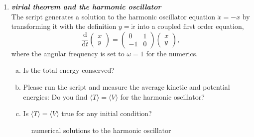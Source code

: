 \documentclass[a4paper,12pt]{article}
\newcommand{\question}[1]{\textbf{\textit{#1}}}
\newcommand{\dd}{\mathrm{d}}
\newcommand{\bra}{\langle}
\newcommand{\ket}{\rangle}
\begin{document}
\begin{enumerate}

\item \question{virial theorem and the harmonic oscillator}\\
The script  generates a solution to the harmonic oscillator equation $\ddot{x} = -x$ by transforming it with the definition $y=\dot{x}$ into a coupled first order equation,
\begin{equation}
\frac{\dd}{\dd t}
\left(
\begin{array}{c}
x\\
y
\end{array}
\right)
=
\left(
\begin{array}{cc}
0 & 1\\
-1 & 0
\end{array}
\right)
\left(
\begin{array}{c}
x\\
y
\end{array}
\right),
\end{equation}
where the angular frequency is set to $\omega=1$ for the numerics.
\begin{enumerate}[(a)]
\item{Is the total energy conserved?}
\item{Please run the script and measure the average kinetic and potential energies: Do you find $\bra T\ket = \bra V\ket$ for the harmonic oscillator?}
\item{Is $\bra T\ket = \bra V\ket$ true for any initial condition?}
\end{enumerate}

\begin{figure}[h]
\begin{center}
\caption{numerical solutions to the harmonic oscillator}
\end{center}
\end{figure}



\end{enumerate}
\end{document}
